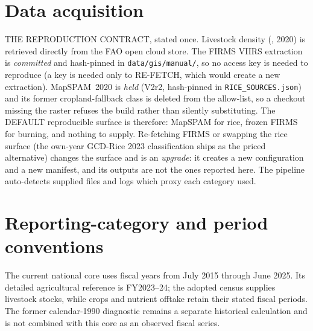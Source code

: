 \section{Data acquisition}
\label{app:data}

THE REPRODUCTION CONTRACT, stated once. Livestock density (\GLW{}, 2020) is retrieved
directly from the FAO open cloud store. The FIRMS VIIRS extraction is \emph{committed}
and hash-pinned in \texttt{data/gis/manual/}, so no access key is needed to reproduce
(a key is needed only to RE-FETCH, which would create a new extraction). MapSPAM~2020
is \emph{held} (V2r2, hash-pinned in \texttt{RICE\_SOURCES.json}) and its former
cropland-fallback class is deleted from the allow-list, so a checkout missing the
raster refuses the build rather than silently substituting. The DEFAULT reproducible
surface is therefore: MapSPAM for rice, frozen FIRMS for burning, and nothing to
supply. Re-fetching FIRMS or swapping the rice surface (the own-year GCD-Rice 2023
classification ships as the priced alternative) changes the surface and is an
\emph{upgrade}: it creates a new configuration and a new manifest, and its outputs
are not the ones reported here. The
pipeline auto-detects supplied files and logs which proxy each category used.

\section{Reporting-category and period conventions}
\label{app:crt}
The current national core uses fiscal years from July 2015 through June 2025.
Its detailed agricultural reference is FY2023--24; the adopted census supplies
livestock stocks, while crops and nutrient offtake retain their stated fiscal
periods. The former calendar-1990 diagnostic remains a separate historical
calculation and is not combined with this core as an observed fiscal series.

